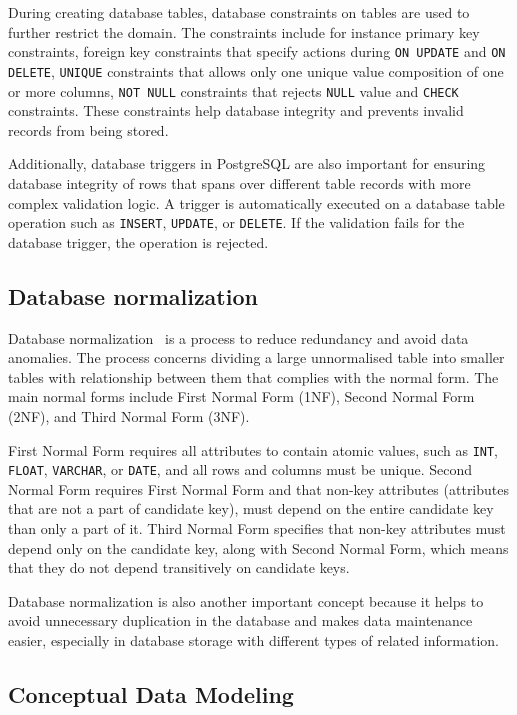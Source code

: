 \documentclass[a4paper]{scrartcl}
\renewcommand{\_}{\textunderscore\allowbreak}
\begin{document}
During creating database tables, database constraints on tables are used to further restrict the domain. The constraints include for instance primary key constraints, foreign key constraints that specify actions during \texttt{ON UPDATE} and \texttt{ON DELETE}, \texttt{UNIQUE} constraints that allows only one unique value composition of one or more columns, \texttt{NOT NULL} constraints that rejects \texttt{NULL} value and \texttt{CHECK} constraints. These constraints help database integrity and prevents invalid records from being stored.

Additionally, database triggers in PostgreSQL are also important for ensuring database integrity of rows that spans over different table records with more complex validation logic. A trigger is automatically executed on a database table operation such as \texttt{INSERT}, \texttt{UPDATE}, or \texttt{DELETE}. If the validation fails for the database trigger, the operation is rejected.

\subsection{Database normalization}

Database normalization~\cite{elmasri,normalisationlecture} is a process to reduce redundancy and avoid data anomalies. The process concerns dividing a large unnormalised table into smaller tables with relationship between them that complies with the normal form. The main normal forms include First Normal Form (1NF), Second Normal Form (2NF), and Third Normal Form (3NF).

First Normal Form requires all attributes to contain atomic values, such as \texttt{INT}, \texttt{FLOAT}, \texttt{VARCHAR}, or \texttt{DATE}, and all rows and columns must be unique. Second Normal Form requires First Normal Form and that non-key attributes (attributes that are not a part of candidate key), must depend on the entire candidate key than only a part of it. Third Normal Form specifies that non-key attributes must depend only on the candidate key, along with Second Normal Form, which means that they do not depend transitively on candidate keys.

Database normalization is also another important concept because it helps to avoid unnecessary duplication in the database and makes data maintenance easier, especially in database storage with different types of related information.

\subsection{Conceptual Data Modeling}
\end{document}
